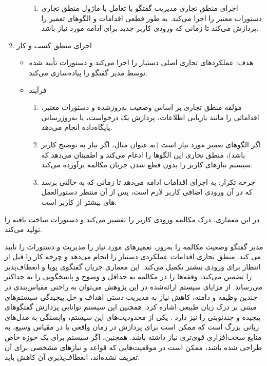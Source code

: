 \begin{enumerate}
\begin{itemize}
\begin{enumerate}
\item
اجرای منطق تجاری%
مدیریت گفتگو با تعامل با ماژول منطق تجاری دستورات معتبر را اجرا می‌کند. به طور قطعی اقدامات و الگوهای تعمیر را پردازش می‌کند تا زمانی که ورودی کاربر جدید برای ادامه مورد نیاز باشد.
\end{enumerate}

\end{itemize}

\item
اجرای منطق کسب و کار
\begin{itemize}
\item
هدف: عملکردهای تجاری اصلی دستیار را اجرا می‌کند و دستورات تأیید شده توسط مدیر گفتگو را پیاده‌سازی می‌کند.
\item
فرآیند
\begin{enumerate}
\item
مؤلفه منطق تجاری بر اساس وضعیت به‌روزشده و دستورات معتبر، اقداماتی را مانند بازیابی اطلاعات، پردازش یک درخواست، یا به‌روزرسانی پایگا‌ه‌داده انجام می‌دهد.
\item
 اگر الگوهای تعمیر مورد نیاز است (به عنوان مثال، اگر نیاز به توضیح کاربر باشد)، منطق تجاری این الگوها را ادغام می‌کند و اطمینان می‌دهد که سیستم نیازهای کاربر را بدون قطع شدن جریان مکالمه برآورده می‌کند.
\item
چرخه تکرار: به اجرای اقدامات ادامه می‌دهد تا زمانی که به حالتی برسد که در آن ورودی اضافی کاربر لازم است، پس از آن منتظر دستورالعمل های بیشتر از کاربر است.
\end{enumerate}
\end{itemize}
\end{enumerate}
در این معماری، درک مکالمه%
 ورودی کاربر را تفسیر می‌کند و دستورات ساخت یافته را تولید می‌کند.

مدیر گفتگو وضعیت مکالمه را به‌روز، تعمیرهای مورد نیاز را مدیریت و دستورات را تأیید می کند.
منطق تجاری اقدامات عملکردی دستیار را انجام می‌دهد و چرخه کار را قبل از انتظار برای ورودی بیشتر تکمیل می‌کند.
این معماری جریان گفتگوی پویا و انعطاف‌پذیر را تضمین می‌کند، وقفه‌ها را در مکالمه به حداقل و وضوح و پاسخگویی را به حداکثر می‌رساند.
\newline
از مزایای سیستم ارائه‌شده در این پژوهش می‌توان به راحتی مقیاس‌بندی در چندین وظیفه و دامنه، کاهش نیاز به مدیریت دستی اهداف و حل پیچیدگی سیستم‌های مبتنی بر درک زبان طبیعی اشاره کرد. همچنین این سیستم توانایی پردازش گفتگوهای پیچیده و چندنوبتی را نیز دارد .
\newline
یکی از محدودیت‌های این سیستم، وابستگی به مدل‌های زبانی بزرگ است که ممکن است برای پردازش در زمان واقعی یا در مقیاس وسیع، به منابع سخت‌افزاری قوی‌تری نیاز داشته باشد. همچنین، اگر سیستم برای یک حوزه خاص طراحی شده باشد، ممکن است در موقعیت‌هایی که قواعد و نیازهای مشخصی برای آن تعریف نشده‌اند، انعطاف‌پذیری آن کاهش یابد.

